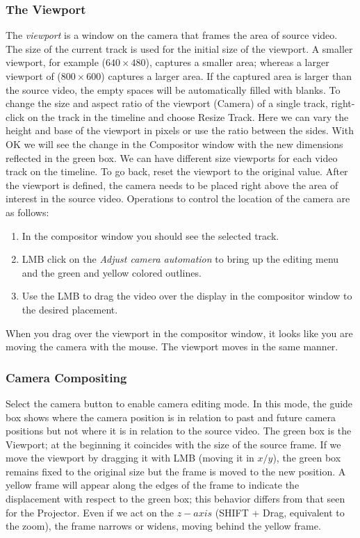 \subsubsection*{The Viewport}%
\label{ssub:viewport}

The \textit{viewport} is a window on the camera that frames the area of source video. The size of the current track is used for the initial size of the viewport. A smaller viewport, for example ($640\times480$), captures a smaller area; whereas a larger viewport of ($800\times600$) captures a larger area.  If the captured area is larger than the source video, the empty spaces will be automatically filled with blanks.  To change the size and aspect ratio of the viewport (Camera) of a single track, right-click on the track in the timeline and choose Resize Track. Here we can vary the height and base of the viewport in pixels or use the ratio between the sides. With OK we will see the change in the Compositor window with the new dimensions reflected in the green box. We can have different size viewports for each video track on the timeline. To go back, reset the viewport to the original value. After the viewport is defined, the camera needs to be placed right above the area of interest in the source video. Operations to control the location of the camera are as follows:

\begin{enumerate}
    \item  In the compositor window you should see the selected track.
    \item  LMB click on the \textit{Adjust camera automation} to bring up the editing menu and the 
green and yellow colored outlines.
    \item  Use the LMB to drag the video over the display in the compositor window to the desired
placement.
\end{enumerate}

When you drag over the viewport in the compositor window, it looks like you are moving the camera
with the mouse.  The viewport moves in the same manner.

\subsubsection*{Camera Compositing}%
\label{ssub:camera_compositing}

Select the camera button to enable camera editing mode. 
In this mode, the guide box shows where the camera position is in relation to past and future camera positions but not where it is in relation to the source video. 
The green box is the Viewport; at the beginning it coincides with the size of the source frame. If we move the viewport by dragging it with LMB (moving it in $x/y$), the green box remains fixed to the original size but the frame is moved to the new position.  A yellow frame will appear along the edges of the frame to indicate the displacement with respect to the green box; this behavior differs from that seen for the Projector. Even if we act on the $z-axis$ (SHIFT + Drag, equivalent to the zoom), the frame narrows or widens, moving behind the yellow frame.

